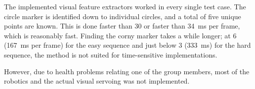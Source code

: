 
The implemented visual feature extractors worked in every single test case.
The circle marker is identified down to individual circles, and a total of five unique points are known.
This is done faster than \SI{30}{\fps} or faster than \SI{34}{\milli\second} per frame, which is reasonably fast.
Finding the corny marker takes a while longer;
at \SI{6}{\fps} (\SI{167}{\milli\second} per frame) for the easy sequence and just below \SI{3}{\fps} (\SI{333}{\milli\second}) for the hard sequence,
the method is not suited for time-sensitive implementations.

However, due to health problems relating one of the group members, most of the robotics and the actual visual servoing was not implemented.
